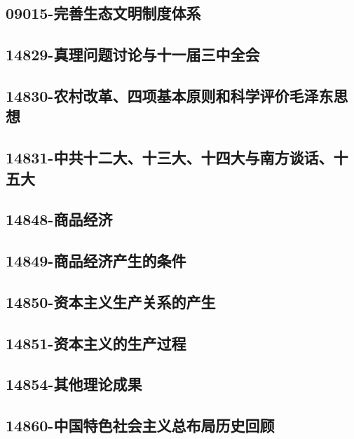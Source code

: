 \subsection{09015-完善生态文明制度体系}

\subsection{14829-真理问题讨论与十一届三中全会}

\subsection{14830-农村改革、四项基本原则和科学评价毛泽东思想}

\subsection{14831-中共十二大、十三大、十四大与南方谈话、十五大}

\subsection{14848-商品经济}

\subsection{14849-商品经济产生的条件}

\subsection{14850-资本主义生产关系的产生}

\subsection{14851-资本主义的生产过程}

\subsection{14854-其他理论成果}

\subsection{14860-中国特色社会主义总布局历史回顾}



